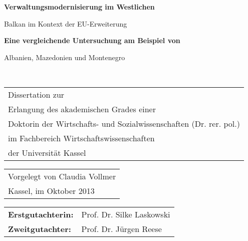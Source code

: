\onehalfspacing
\newpage
\setlength{\voffset}{30mm}
\begin{center}

{\huge \bfseries Verwaltungsmodernisierung im Westlichen\par Balkan im Kontext der EU-Erweiterung}

\vspace{10mm}

 {\Large\bfseries  Eine vergleichende Untersuchung am Beispiel von \par Albanien, Mazedonien und Montenegro}\\
\end{center}
\vspace{5cm}
\begin{large}
\begin{tabular}{p{24cm}}
Dissertation zur \\
Erlangung des akademischen Grades einer \\
Doktorin der Wirtschafts- und Sozialwissenschaften (Dr. rer. pol.) \\
im Fachbereich Wirtschaftswissenschaften\\
der Universität Kassel\\
\end{tabular}

\vspace{1cm}

\begin{tabular}{p{24cm}}
Vorgelegt von Claudia Vollmer\\
Kassel, im Oktober 2013\\
\end{tabular}

\vspace{1cm}

\begin{tabular}{ll}
{\bf Erstgutachterin:} &  Prof. Dr. Silke Laskowski\\
{\bf Zweitgutachter:}&Prof. Dr. Jürgen Reese\\
\end{tabular}
\end{large}
\clearpage
\setlength{\voffset}{0mm}
%

%

%
  
\tableofcontents
\newpage
\listoffigures
\newpage
\listoftables
\newpage

